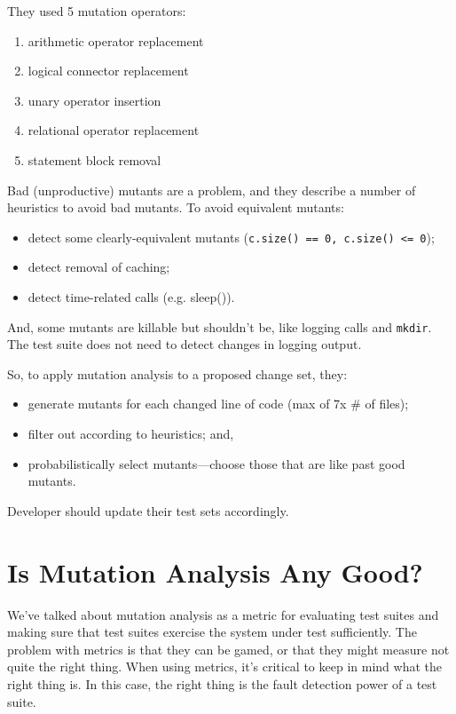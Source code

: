 \documentclass[11pt]{article}
\begin{document}
They used 5 mutation operators:
\begin{enumerate}[noitemsep]
\item arithmetic operator replacement
\item     logical connector replacement
\item     unary operator insertion
\item     relational operator replacement
\item     statement block removal
\end{enumerate}

Bad (unproductive) mutants are a problem, and they describe a number of heuristics to avoid bad mutants. To avoid equivalent mutants:
\begin{itemize}[noitemsep]
    \item detect some clearly-equivalent mutants
      (\texttt{c.size() == 0, c.size() <= 0});
    \item detect removal of caching;
    \item detect time-related calls (e.g. sleep()).
\end{itemize}

And, some mutants are killable but shouldn't be, like logging calls and \texttt{mkdir}. The test suite does not need to detect changes in logging output.

So, to apply mutation analysis to a proposed change set, they:
    \begin{itemize}[noitemsep]
    \item generate mutants for each changed line of code (max of 7x \# of files);
    \item filter out according to heuristics; and,
    \item probabilistically select mutants---choose those that are like past good mutants.
    \end{itemize}
    Developer should update their test sets accordingly.

\section*{Is Mutation Analysis Any Good?}
We've talked about mutation analysis as a metric for evaluating test
suites and making sure that test suites exercise the system under test
sufficiently. The problem with metrics is that they can be gamed, or
that they might measure not quite the right thing. When using metrics,
it's critical to keep in mind what the right thing is. In this case,
the right thing is the fault detection power of a test suite.
\end{document}
